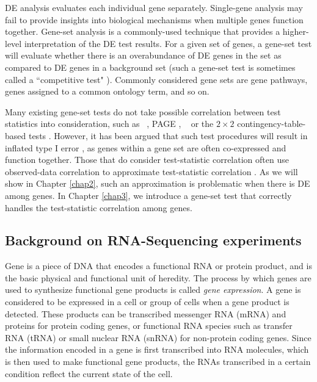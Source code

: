 DE analysis evaluates each individual gene separately. Single-gene analysis
may fail to provide insights into biological mechanisms when multiple genes
function together.  Gene-set analysis is a commonly-used technique that
provides a higher-level interpretation of the DE test results. For a given set
of genes, a gene-set test will evaluate whether there is an overabundance of DE
genes in the set as compared to DE genes in a background set (such a
gene-set test is sometimes called a ``competitive test" 
\citep{goeman2007analyzing}). Commonly considered gene sets are gene pathways, genes assigned to a 
common ontology term, and so on.

Many existing gene-set tests do not take possible correlation between test
statistics into consideration, such as \gent~\citep{tian2005discovering}, PAGE
\citep{kim2005page}, \genr~\citep{michaud2008integrative} or the $2\times 2$ contingency-table-based
tests \cite{alexa2010topgo, huang2007david,ye2006wego}. However, it has been argued that such test
procedures will result in inflated type I error 
\citep{efron2007testing,gatti2010heading,goeman2007analyzing,wu2012camera,yaari2013quantitative}, 
as genes within a gene set are often co-expressed and function together. Those that do consider 
test-statistic correlation often use 
observed-data correlation to approximate test-statistic correlation 
\citep{barry2008statistical,wu2012camera,yaari2013quantitative}. As we will show in
Chapter \ref{chap2}, such an approximation is problematic when there is DE among genes. In
Chapter \ref{chap3}, we introduce a gene-set test that correctly handles the
test-statistic correlation among genes. 



\subsection{Background on RNA-Sequencing experiments}\label{subsec:RNABackground}

Gene is a piece of DNA that encodes a functional RNA or protein product, and is the basic physical
and functional unit of heredity. The process by which genes are used to synthesize functional gene
products is called \textit{gene expression}.  A gene is considered to be expressed in a cell or
group of cells when a gene product is detected.
These products can be transcribed messenger RNA (mRNA) and proteins for protein coding genes, or
functional RNA species such as transfer RNA (tRNA) or small nuclear RNA (snRNA) for non-protein
coding genes.
Since the information encoded in a gene is first transcribed into RNA molecules, which is then used
to make functional gene products, the RNAs transcribed
in a certain condition reflect the current state of the cell.

